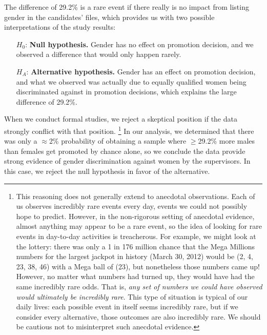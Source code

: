The difference of 29.2\% is a rare event if there really is no impact from listing gender in the candidates' files, which provides us with two possible interpretations of the study results:
\begin{itemize}
\setlength{\itemsep}{0mm}
\item[$H_0$:] \textbf{Null hypothesis.} Gender has no effect on promotion decision, and we observed a difference that would only happen rarely.
\item[$H_A$:] \textbf{Alternative hypothesis.} Gender has an effect on promotion decision, and what we observed was actually due to equally qualified women being discriminated against in promotion decisions, which explains the large difference of 29.2\%.
\end{itemize}
When we conduct formal studies, we reject a skeptical position if the data strongly conflict with that position.%
\footnote{This reasoning does not generally extend to anecdotal observations. Each of us observes incredibly rare events every day, events we could not possibly hope to predict. However, in the non-rigorous setting of anecdotal evidence, almost anything may appear to be a rare event, so the idea of looking for rare events in day-to-day activities is treacherous. For example, we might look at the lottery: there was only a 1 in 176 million chance that the Mega Millions numbers for the largest jackpot in history (March 30, 2012) would be (2, 4, 23, 38, 46) with a Mega ball of (23), but nonetheless those numbers came up! However, no matter what numbers had turned up, they would have had the same incredibly rare odds. That is, \emph{any set of numbers we could have observed would ultimately be incredibly rare}. This type of situation is typical of our daily lives: each possible event in itself seems incredibly rare, but if we consider every alternative, those outcomes are also incredibly rare. We should be cautious not to misinterpret such anecdotal evidence.} 
In our analysis, we determined that there was only a $\approx$2\% probability of obtaining a sample where $\geq$29.2\% more males than females get promoted by chance alone, so we conclude the data provide strong evidence of gender discrimination against women by the supervisors. In this case, we reject the null hypothesis in favor of the alternative.


